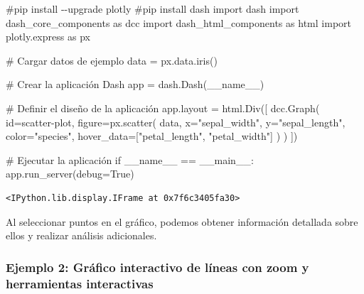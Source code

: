\documentclass[
  a4paper,
]{article}
\newenvironment{Shaded}{}{}
\newcommand{\BuiltInTok}[1]{\textcolor[rgb]{0.84,0.23,0.29}{#1}}
\newcommand{\CommentTok}[1]{\textcolor[rgb]{0.42,0.45,0.49}{#1}}
\newcommand{\ControlFlowTok}[1]{\textcolor[rgb]{0.84,0.23,0.29}{#1}}
\newcommand{\ImportTok}[1]{\textcolor[rgb]{0.01,0.18,0.38}{#1}}
\newcommand{\NormalTok}[1]{\textcolor[rgb]{0.14,0.16,0.18}{#1}}
\newcommand{\OperatorTok}[1]{\textcolor[rgb]{0.14,0.16,0.18}{#1}}
\newcommand{\StringTok}[1]{\textcolor[rgb]{0.01,0.18,0.38}{#1}}
\newcommand{\VariableTok}[1]{\textcolor[rgb]{0.89,0.38,0.04}{#1}}
\begin{document}
\begin{Shaded}
\begin{Highlighting}[]
\CommentTok{\#pip install {-}{-}upgrade plotly}
\CommentTok{\#pip install dash}
\ImportTok{import}\NormalTok{ dash}
\ImportTok{import}\NormalTok{ dash\_core\_components }\ImportTok{as}\NormalTok{ dcc}
\ImportTok{import}\NormalTok{ dash\_html\_components }\ImportTok{as}\NormalTok{ html}
\ImportTok{import}\NormalTok{ plotly.express }\ImportTok{as}\NormalTok{ px}

\CommentTok{\# Cargar datos de ejemplo}
\NormalTok{data }\OperatorTok{=}\NormalTok{ px.data.iris()}

\CommentTok{\# Crear la aplicación Dash}
\NormalTok{app }\OperatorTok{=}\NormalTok{ dash.Dash(}\VariableTok{\_\_name\_\_}\NormalTok{)}

\CommentTok{\# Definir el diseño de la aplicación}
\NormalTok{app.layout }\OperatorTok{=}\NormalTok{ html.Div([}
\NormalTok{    dcc.Graph(}
        \BuiltInTok{id}\OperatorTok{=}\StringTok{\textquotesingle{}scatter{-}plot\textquotesingle{}}\NormalTok{,}
\NormalTok{        figure}\OperatorTok{=}\NormalTok{px.scatter(}
\NormalTok{            data, x}\OperatorTok{=}\StringTok{"sepal\_width"}\NormalTok{, y}\OperatorTok{=}\StringTok{"sepal\_length"}\NormalTok{, color}\OperatorTok{=}\StringTok{"species"}\NormalTok{,}
\NormalTok{            hover\_data}\OperatorTok{=}\NormalTok{[}\StringTok{"petal\_length"}\NormalTok{, }\StringTok{"petal\_width"}\NormalTok{]}
\NormalTok{        )}
\NormalTok{    )}
\NormalTok{])}

\CommentTok{\# Ejecutar la aplicación}
\ControlFlowTok{if} \VariableTok{\_\_name\_\_} \OperatorTok{==} \StringTok{\textquotesingle{}\_\_main\_\_\textquotesingle{}}\NormalTok{:}
\NormalTok{    app.run\_server(debug}\OperatorTok{=}\VariableTok{True}\NormalTok{)}
\end{Highlighting}
\end{Shaded}

\begin{verbatim}
<IPython.lib.display.IFrame at 0x7f6c3405fa30>
\end{verbatim}

Al seleccionar puntos en el gráfico, podemos obtener información
detallada sobre ellos y realizar análisis adicionales.

\hypertarget{ejemplo-2-gruxe1fico-interactivo-de-luxedneas-con-zoom-y-herramientas-interactivas}{%
\subsubsection{Ejemplo 2: Gráfico interactivo de líneas con zoom y
herramientas
interactivas}\label{ejemplo-2-gruxe1fico-interactivo-de-luxedneas-con-zoom-y-herramientas-interactivas}}
\end{document}
